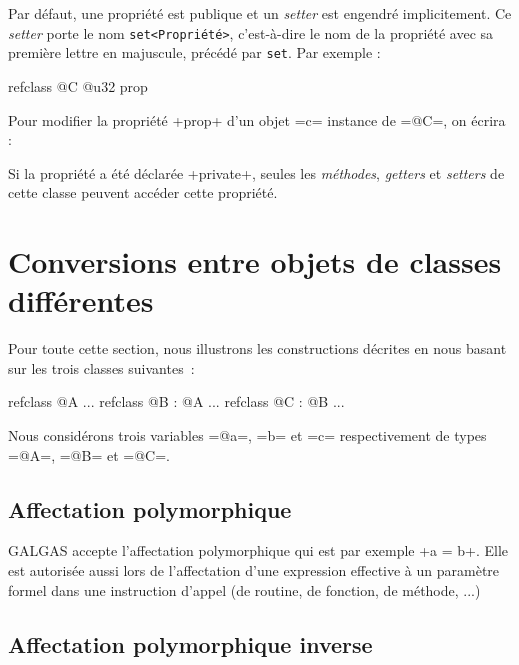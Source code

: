Par défaut, une propriété est publique et un \emph{setter} est engendré implicitement. Ce \emph{setter} porte le nom \texttt{set<Propriété>}, c'est-à-dire le nom de la propriété avec sa première lettre en majuscule, précédé par \texttt{set}. Par exemple :

\begin{galgas4}
refclass @C {
  @u32 prop
}
\end{galgas4}


Pour modifier la propriété \ggsq+prop+ d'un objet \ggsq=c= instance de \ggsq=@C=, on écrira :

\begin{galgas4}
[!?c setProp !12]
\end{galgas4}

Si la propriété a été déclarée \ggsq+private+, seules les \emph{méthodes}, \emph{getters} et \emph{setters} de cette classe peuvent accéder cette propriété.












\section{Conversions entre objets de classes différentes}

Pour toute cette section, nous illustrons les constructions décrites en nous basant sur les trois classes suivantes~:
\begin{galgas4}
refclass @A {
  ...
}
refclass @B : @A {
  ...
}
refclass @C : @B {
  ...
}
\end{galgas4}

Nous considérons trois variables \ggsq=@a=, \ggsq=b= et \ggsq=c= respectivement de types \ggsq=@A=, \ggsq=@B= et \ggsq=@C=.


\subsection{Affectation polymorphique}

GALGAS accepte l'affectation polymorphique qui est par exemple \ggsq+a = b+. Elle est autorisée aussi lors de l'affectation d'une expression effective à un paramètre formel dans une instruction d'appel (de routine, de fonction, de méthode, ...)


\subsection{Affectation polymorphique inverse}

